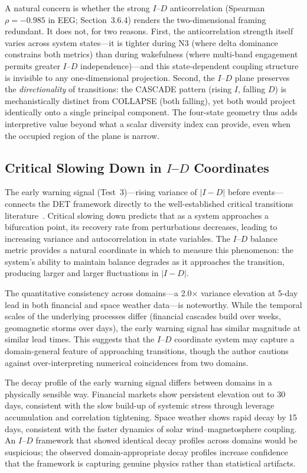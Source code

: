 \documentclass[aip,cha,reprint,amsmath,amssymb]{revtex4-2}
\begin{document}
A natural concern is whether the strong $I$--$D$ anticorrelation (Spearman $\rho = -0.985$ in EEG; Section~3.6.4) renders the two-dimensional framing redundant. It does not, for two reasons. First, the anticorrelation strength itself varies across system states---it is tighter during N3 (where delta dominance constrains both metrics) than during wakefulness (where multi-band engagement permits greater $I$--$D$ independence)---and this state-dependent coupling structure is invisible to any one-dimensional projection. Second, the $I$--$D$ plane preserves the \emph{directionality} of transitions: the CASCADE pattern (rising $I$, falling $D$) is mechanistically distinct from COLLAPSE (both falling), yet both would project identically onto a single principal component. The four-state geometry thus adds interpretive value beyond what a scalar diversity index can provide, even when the occupied region of the plane is narrow.

\subsection{Critical Slowing Down in $I$--$D$ Coordinates}

The early warning signal (Test~3)---rising variance of $|I - D|$ before events---connects the DET framework directly to the well-established critical transitions literature~\cite{scheffer2009,dakos2012}. Critical slowing down predicts that as a system approaches a bifurcation point, its recovery rate from perturbations decreases, leading to increasing variance and autocorrelation in state variables. The $I$--$D$ balance metric provides a natural coordinate in which to measure this phenomenon: the system's ability to maintain balance degrades as it approaches the transition, producing larger and larger fluctuations in $|I - D|$.

The quantitative consistency across domains---a 2.0$\times$ variance elevation at 5-day lead in both financial and space weather data---is noteworthy. While the temporal scales of the underlying processes differ (financial cascades build over weeks, geomagnetic storms over days), the early warning signal has similar magnitude at similar lead times. This suggests that the $I$--$D$ coordinate system may capture a domain-general feature of approaching transitions, though the author cautions against over-interpreting numerical coincidences from two domains.

The decay profile of the early warning signal differs between domains in a physically sensible way. Financial markets show persistent elevation out to 30 days, consistent with the slow build-up of systemic stress through leverage accumulation and correlation tightening. Space weather shows rapid decay by 15 days, consistent with the faster dynamics of solar wind--magnetosphere coupling. An $I$--$D$ framework that showed identical decay profiles across domains would be suspicious; the observed domain-appropriate decay profiles increase confidence that the framework is capturing genuine physics rather than statistical artifacts.
\end{document}
